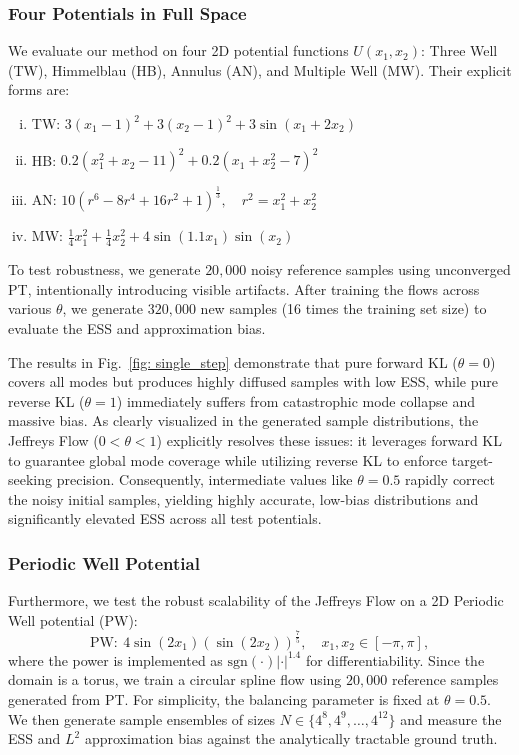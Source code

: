 \documentclass[%
 reprint,
 amsmath,amssymb,
 aps,
 pre,
]{revtex4-2}
\newcommand{\setzero}{\setlength{\itemsep}{0pt}}
\begin{document}
\subsubsection*{Four Potentials in Full Space}

We evaluate our method on four 2D potential  functions $U(x_1, x_2)$: Three Well (TW), Himmelblau (HB), Annulus (AN), and Multiple Well (MW). Their explicit forms are:
\begin{enumerate}[(i)]
	\setzero
	\item TW: $3(x_1-1)^2 + 3(x_2-1)^2 + 3\sin(x_1+2x_2)$ 
	\item HB: $0.2(x_1^2 + x_2 - 11)^2 + 0.2(x_1 + x_2^2 - 7)^2$
	\item AN: $10(r^6 - 8r^4 + 16r^2 + 1)^{\frac13}, \quad r^2=x_1^2+x_2^2$ 
	\item MW: $\frac{1}{4}x_1^2 + \frac{1}{4} x_2^2 + 4 \sin(1.1x_1) \sin(x_2)$ 
\end{enumerate}

To test robustness, we generate $20,000$ noisy reference samples using unconverged PT, intentionally introducing visible artifacts. After training the flows across various $\theta$, we generate $320,000$ new samples (16 times the training set size) to evaluate the ESS and approximation bias.

The results in Fig.~\ref{fig: single_step} demonstrate that pure forward KL ($\theta=0$) covers all modes but produces highly diffused samples with low ESS, while pure reverse KL ($\theta=1$) immediately suffers from catastrophic mode collapse and massive bias. As clearly visualized in the generated sample distributions, the Jeffreys Flow ($0 < \theta < 1$) explicitly resolves these issues: it leverages forward KL to guarantee global mode coverage while utilizing reverse KL to enforce target-seeking precision. Consequently, intermediate values like $\theta=0.5$ rapidly correct the noisy initial samples, yielding highly accurate, low-bias distributions and significantly elevated ESS across all test potentials.

\subsubsection*{Periodic Well Potential}

Furthermore, we test the robust scalability of the Jeffreys Flow on a 2D Periodic Well potential (PW):
\begin{equation*}
	\mathrm{PW:}~4 \sin(2x_1 )(\sin(2x_2))^{\frac75}, \quad 
	x_1, x_2 \in [-\pi, \pi],
\end{equation*}
where the power is implemented as $\mathrm{sgn}(\cdot)|\cdot|^{1.4}$ for differentiability. Since the domain is a torus, we train a circular spline flow using $20,000$ reference samples generated from PT. For simplicity, the balancing parameter is fixed at $\theta=0.5$. We then generate sample ensembles of sizes $N \in \{4^8, 4^9, \dots, 4^{12}\}$ and measure the ESS and $L^2$ approximation bias against the analytically tractable ground truth.
\end{document}
